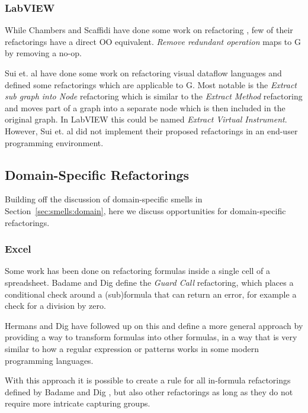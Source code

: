 \documentclass[10pt,conference,compsocconf]{IEEEtran}
\begin{document}
\subsubsection{LabVIEW}

While Chambers and Scaffidi have done some work on refactoring \cite{chambers2015impact}, few of their refactorings have a direct OO equivalent. \emph{Remove redundant operation} maps to G by removing a no-op.

Sui et. al \cite{sui2008automated} have done some work on refactoring visual dataflow languages and defined some refactorings which are applicable to G.
Most notable is the \textit{Extract sub graph into Node} refactoring which is similar to the \textit{Extract Method} refactoring and moves part of a graph into a separate node which is then included in the original graph.
In LabVIEW this could be named \textit{Extract Virtual Instrument}.
However, Sui et. al did not implement their proposed refactorings in an end-user programming environment.

\subsection{Domain-Specific Refactorings}

Building off the discussion of domain-specific smells in Section~\ref{sec:smells:domain}, here we discuss opportunities for domain-specific refactorings. 

\subsubsection{Excel}

Some work has been done on refactoring formulas inside a single cell of a spreadsheet. Badame and Dig \cite{badame2012refactoring} define the \textit{Guard Call} refactoring, which places a conditional check around a (sub)formula that can return an error, for example a check for a division by zero.

Hermans and Dig \cite{hermans2014bumblebee} have followed up on this and define a more general approach by providing a way to transform formulas into other formulas, in a way that is very similar to how a regular expression or patterns works in some modern programming languages.

 With this approach it is possible to create a rule for all in-formula refactorings defined by Badame and Dig \cite{badame2012refactoring}, but also other refactorings as long as they do not require more intricate capturing groups.
\end{document}
